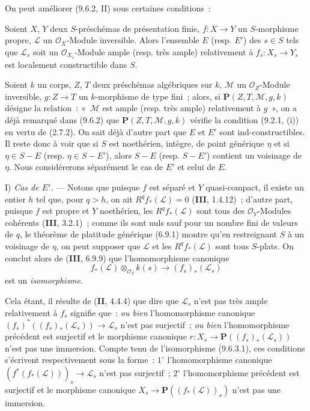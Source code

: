 On peut améliorer (9.6.2, II) sous certaines conditions~:

\begin{proposition}[9.6.3]
\label{IV.9.6.3-fr}
Soient $X$, $Y$ deux $S$-préschémas de présentation finie, $f:X\to Y$ un
$S$-morphisme propre, $\mathcal L$ un $\mathcal O_X$-Module inversible. Alors
l'ensemble $E$ (resp. $E'$) des $s\in S$ tels que $\mathcal L_s$ soit un
$\mathcal O_{X_s}$-Module ample (resp. très ample) relativement à
$f_s:X_s\to Y_s$ est localement constructible dans $S$.
\end{proposition}

Soient $k$ un corps, $Z$, $T$ deux préschémas algébriques sur $k$, $\mathcal M$
un $\mathcal O_Z$-Module inversible, $g:Z\to T$ un $k$-morphisme de type fini~;
alors, si $\mathbf P(Z,T,\mathcal M,g,k)$ désigne la relation~: «~$\mathcal M$ est ample
(resp. très ample) relativement à $g$~», on a déjà remarqué dans (9.6.2) que
$\mathbf P(Z,T,\mathcal M,g,k)$ vérifie la condition (9.2.1, (i)) en vertu de (2.7.2).
On sait déjà d'autre part que $E$ et $E'$ sont ind-constructibles. Il reste donc
à voir que si $S$ est noethérien, intègre, de point générique $\eta$ et si
$\eta\in S-E$ (resp. $\eta\in S-E'$), alors $S-E$ (resp. $S-E'$) contient un
voisinage de $\eta$. Nous considérerons séparément le cas de $E'$ et celui de
$E$.

I) \emph{Cas de $E'$.} --- Notons que puisque $f$ est séparé et $Y$
quasi-compact, il existe un entier $h$ tel que, pour $q>h$, on ait
$R^qf_*(\mathcal L)=0$ (\textbf{III}, 1.4.12)~; d'autre part, puisque $f$ est
propre et $Y$ noethérien, les $R^qf_*(\mathcal L)$ sont tous des
$\mathcal O_Y$-Modules cohérents (\textbf{III}, 3.2.1)~; comme ils sont nuls
sauf pour un nombre fini de valeurs de $q$, le théorème de platitude générique
(6.9.1) montre qu'en restreignant $S$ à un voisinage de $\eta$, on peut
supposer que $\mathcal L$ et les $R^qf_*(\mathcal L)$ sont tous $S$-plats. On
conclut alors de (\textbf{III}, 6.9.9) que l'homomorphisme canonique
\begin{equation}
\label{IV.9.6.3.1-fr}
 f_*(\mathcal L)\otimes_{\mathcal O_S} k(s)
 \longrightarrow (f_s)_*(\mathcal L_s)
 \tag{9.6.3.1}
\end{equation}
est un \emph{isomorphisme}.


Cela étant, il résulte de (\textbf{II}, 4.4.4) que dire que $\mathcal L_s$
n'est pas très ample relativement à $f_s$ signifie que~: \emph{ou bien}
l'homomorphisme canonique
$(f_s)^*((f_s)_*(\mathcal L_s))\to\mathcal L_s$ n'est pas surjectif~; \emph{ou
bien} l'homomorphisme précédent est surjectif et le morphisme canonique
$r:X_s\to\mathbf P((f_s)_*(\mathcal L_s))$ n'est pas une immersion. Compte
tenu de l'isomorphisme (9.6.3.1), ces conditions s'écrivent respectivement sous
la forme~: $1^\circ$ l'homomorphisme canonique
$(f^*(f_*(\mathcal L)))_s\to\mathcal L_s$ n'est pas surjectif~; $2^\circ$
l'homomorphisme précédent est surjectif et le morphisme canonique
$X_s\to\mathbf P((f_*(\mathcal L))_s)$ n'est pas une immersion.

